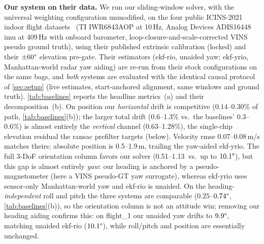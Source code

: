 \textbf{Our system on their data.}  We run our sliding-window solver,
with the universal weighting configuration unmodified, on the four
public ICINS-2021 indoor flight datasets~\cite{doer2021yrio}
(TI IWR6843AOP at 10\,Hz, Analog Devices ADIS16448 \ac{imu} at 409\,Hz with
onboard barometer, loop-closure-and-scale-corrected VINS pseudo ground
truth), using their published extrinsic calibration (locked) and
their $\pm 60\degree$ elevation pre-gate.  Their estimators
(\mbox{ekf-rio}, unaided yaw; \mbox{ekf-yrio}, Manhattan-world radar
yaw aiding) are re-run from their stock configurations on the same
bags, and \emph{both} systems are evaluated with the identical causal
protocol of \autoref{sec:setup} (live estimates, start-anchored
alignment, same windows and ground truth).
\autoref{tab:baselines} reports the headline metrics~(a) and their
decomposition~(b).  On position our \emph{horizontal} drift is
competitive ($0.14$--$0.30\%$ of path, \autoref{tab:baselines}(b)); the
larger total drift (0.6--1.3\% vs.\ the baselines' 0.3--0.6\%) is almost
entirely the \emph{vertical} channel (0.63--1.28\%), the single-chip
elevation residual the \ac{ransac} prefilter targets (below).  Velocity
\ac{rmse} 0.07--0.08\,m/s matches theirs; absolute position is
0.5--1.9\,m, trailing the yaw-aided ekf-yrio.
The full 3-DoF orientation column favors our solver
(0.51--1.13\degree\ vs.\ up to $10.1\degree$), but this gap is almost
entirely \emph{yaw}: our heading is anchored by a pseudo-magnetometer
(here a VINS pseudo-GT yaw surrogate), whereas
ekf-yrio uses sensor-only Manhattan-world yaw and ekf-rio is unaided.
On the heading-\emph{independent} roll and pitch the three systems are
comparable ($0.25$--$0.74\degree$, \autoref{tab:baselines}(b)),
so the orientation column is not an attitude win; removing our heading
aiding confirms this: on flight\_1 our unaided yaw drifts to
$9.9\degree$, matching unaided ekf-rio ($10.1\degree$), while roll/pitch
and position are essentially unchanged.

